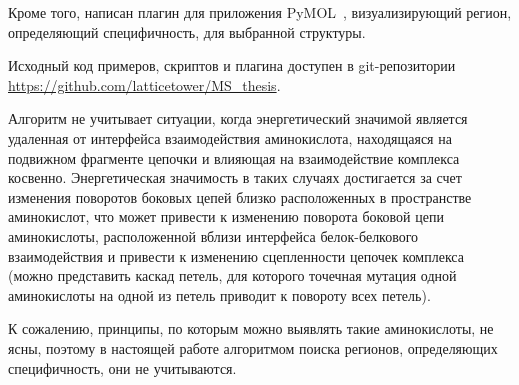 Кроме того, написан плагин для приложения PyMOL~\cite{pymol}, визуализирующий регион, определяющий специфичность, для выбранной структуры.

Исходный код примеров, скриптов и плагина доступен в git-репозитории \url{https://github.com/latticetower/MS_thesis}.

Алгоритм не учитывает ситуации, когда энергетический значимой является удаленная от интерфейса взаимодействия аминокислота, находящаяся на подвижном фрагменте цепочки и влияющая на взаимодействие комплекса косвенно. Энергетическая значимость в таких случаях достигается за счет изменения поворотов боковых цепей близко расположенных в пространстве аминокислот, что может привести к изменению поворота боковой цепи аминокислоты, расположенной вблизи интерфейса белок-белкового взаимодействия и привести к изменению сцепленности цепочек комплекса (можно представить каскад петель, для которого точечная мутация одной аминокислоты на одной из петель приводит к повороту всех петель).

К сожалению, принципы, по которым можно выявлять такие аминокислоты, не ясны, поэтому в настоящей работе алгоритмом поиска  регионов, определяющих специфичность, они не учитываются.